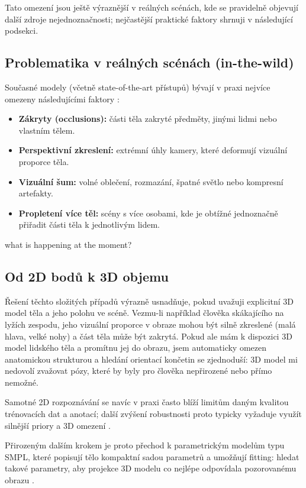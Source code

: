 \documentclass[11pt,a4paper,twoside,openright]{report}
\begin{document}
Tato omezení jsou ještě výraznější v reálných scénách, kde se pravidelně objevují další zdroje nejednoznačnosti; nejčastější praktické faktory shrnuji v následující podsekci.

\subsection{Problematika v reálných scénách (in-the-wild)}
\label{sec:problematika-in-the-wild}

Současné modely (včetně state-of-the-art přístupů) bývají v praxi nejvíce omezeny následujícími faktory \cite{guler2018densepose,wang2024prompthmr}:

\begin{itemize}
    \item \textbf{Zákryty (occlusions):} části těla zakryté předměty, jinými lidmi nebo vlastním tělem.
    \item \textbf{Perspektivní zkreslení:} extrémní úhly kamery, které deformují vizuální proporce těla.
    \item \textbf{Vizuální šum:} volné oblečení, rozmazání, špatné světlo nebo kompresní artefakty.
    \item \textbf{Propletení více těl:} scény s více osobami, kde je obtížné jednoznačně přiřadit části těla k jednotlivým lidem.
\end{itemize}
what is happening at the moment?
\subsection{Od 2D bodů k 3D objemu}

Řešení těchto složitých případů výrazně usnadňuje, pokud uvažuji explicitní 3D model těla a jeho polohu ve scéně. Vezmu-li například člověka skákajícího na lyžích zespodu, jeho vizuální proporce v obraze mohou být silně zkreslené (malá hlava, velké nohy) a část těla může být zakrytá. Pokud ale mám k dispozici 3D model lidského těla a promítnu jej do obrazu, jsem automaticky omezen anatomickou strukturou a hledání orientací končetin se zjednoduší: 3D model mi nedovolí zvažovat pózy, které by byly pro člověka nepřirozené nebo přímo nemožné.

Samotné 2D rozpoznávání se navíc v praxi často blíží limitům daným kvalitou trénovacích dat a anotací; další zvýšení robustnosti proto typicky vyžaduje využít silnější priory a 3D omezení \cite{wang2024prompthmr}.

Přirozeným dalším krokem je proto přechod k parametrickým modelům typu SMPL, které popisují tělo kompaktní sadou parametrů a umožňují fitting: hledat takové parametry, aby projekce 3D modelu co nejlépe odpovídala pozorovanému obrazu \cite{SMPL:2015}.
\end{document}
